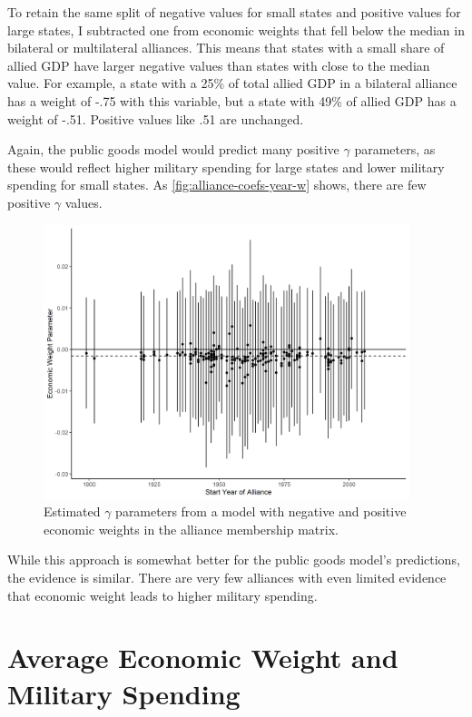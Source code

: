 \documentclass[12pt]{article}
\begin{document}
To retain the same split of negative values for small states and positive values for large states, I subtracted one from economic weights that fell below the median in bilateral or multilateral alliances. 
This means that states with a small share of allied GDP have larger negative values than states with close to the median value. 
For example, a state with a 25\% of total allied GDP  in a bilateral alliance has a weight of -.75 with this variable, but a state with 49\% of allied GDP has a weight of -.51. 
Positive values like .51 are unchanged.


Again, the public goods model would predict many positive $\gamma$ parameters, as these would reflect higher military spending for large states and lower military spending for small states. 
As \autoref{fig:alliance-coefs-year-w} shows, there are few positive $\gamma$ values.  


\begin{figure}[htbp]
	\centering
		\includegraphics[width=0.95\textwidth]{alliance-coefs-year-w.png}
	\caption{Estimated $\gamma$ parameters from a model with negative and positive economic weights in the alliance membership matrix.}
	\label{fig:alliance-coefs-year-w}
\end{figure}

While this approach is somewhat better for the public goods model's predictions, the evidence is similar. 
There are very few alliances with even limited evidence that economic weight leads to higher military spending. 



\section{Average Economic Weight and Military Spending}
\end{document}
